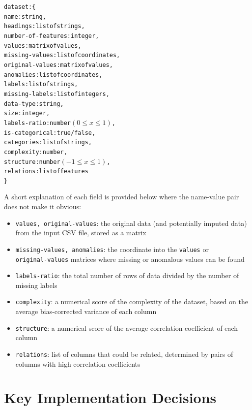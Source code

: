 \documentclass[titlepage]{article}
\begin{document}
\begin{alltt}
  dataset: \{
    name: string,
    headings: list of strings,
    number-of-features: integer,
    values: matrix of values,
    missing-values: list of coordinates,
    original-values\footnotemark: matrix of values,
    anomalies: list of coordinates,
    labels: list of strings,
    missing-labels: list of integers,
    data-type: string,
    size: integer,
    labels-ratio: number \((0 \leq x \leq 1)\),
    is-categorical: true / false,
    categories\footnotemark: list of strings, 
    complexity: number,
    structure: number \((-1 \leq x \leq 1)\),
    relations: list of features
  \}
\end{alltt}

A short explanation of each field is provided below where the name-value pair does not make it obvious:
\begin{itemize}
  \item \verb|values, original-values|: the original data (and potentially imputed data) from the input CSV file, stored as a matrix
  \item \verb|missing-values, anomalies|: the coordinate into the \verb|values| or \\\verb|original-values| matrices where missing or anomalous values can be found
  \item \verb|labels-ratio|: the total number of rows of data divided by the number of missing labels
  \item \verb|complexity|: a numerical score of the complexity of the dataset, based on the average bias-corrected variance of each column
  \item \verb|structure|: a numerical score of the average correlation coefficient of each column
  \item \verb|relations|: list of columns that could be related, determined by pairs of columns with high correlation coefficients
\end{itemize}

\section{Key Implementation Decisions}
\end{document}
